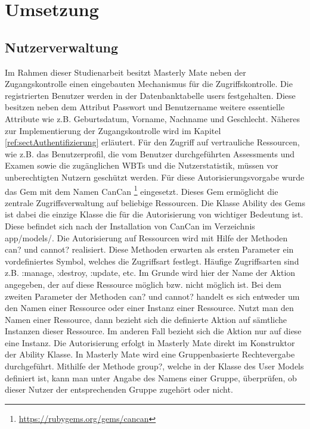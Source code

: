 \chapter{Umsetzung}\label{ref:chaptImplementation}

\section{Nutzerverwaltung}\label{ref:sectNutzerverwaltung}
Im Rahmen dieser Studienarbeit besitzt Masterly Mate neben der Zugangskontrolle
einen eingebauten Mechanismus für die Zugriffskontrolle. Die registrierten
Benutzer werden in der Datenbanktabelle users festgehalten. Diese besitzen neben
dem Attribut Passwort und Benutzername weitere essentielle Attribute wie z.B.
Geburtsdatum, Vorname, Nachname und Geschlecht. Näheres zur Implementierung der
Zugangskontrolle wird im Kapitel \ref{ref:sectAuthentifizierung} erläutert.
Für den Zugriff auf vertrauliche Ressourcen, wie z.B. das Benutzerprofil, die
vom Benutzer durchgeführten Assessments und Examen sowie die zugänglichen WBTs
und die Nutzerstatistik, müssen vor unberechtigten Nutzern geschützt werden.
Für diese Autorisierungsvorgabe wurde das Gem mit dem Namen CanCan
\footnote{\url{https://rubygems.org/gems/cancan}} eingesetzt. Dieses Gem
ermöglicht die zentrale Zugriffsverwaltung auf beliebige Ressourcen. Die Klasse Ability des
Gems ist dabei die einzige Klasse die für die Autorisierung von wichtiger
Bedeutung ist. Diese befindet sich nach der Installation von CanCan im
Verzeichnis app/models/. Die Autorisierung auf Ressourcen wird mit Hilfe der
Methoden can? und cannot? realisiert. Diese Methoden erwarten als ersten
Parameter ein vordefiniertes Symbol, welches die Zugriffsart festlegt. Häufige
Zugriffsarten sind z.B. :manage, :destroy, :update, etc. Im Grunde wird hier der Name der
Aktion angegeben, der auf diese Ressource möglich bzw. nicht möglich ist. Bei
dem zweiten Parameter der Methoden can? und cannot? handelt es sich entweder um
den Namen einer Ressource oder einer Instanz einer Ressource. Nutzt man den
Namen einer Ressource, dann bezieht sich die definierte Aktion auf sämtliche
Instanzen dieser Ressource. Im anderen Fall bezieht sich die Aktion nur auf
diese eine Instanz. Die Autorisierung erfolgt in Masterly Mate direkt im
Konstruktor der Ability Klasse. In Masterly Mate wird eine Gruppenbasierte
Rechtevergabe durchgeführt. Mithilfe der Methode group?, welche in der Klasse
des User Models definiert ist, kann man unter Angabe des Namens einer Gruppe,
überprüfen, ob dieser Nutzer der entsprechenden Gruppe zugehört oder nicht.
